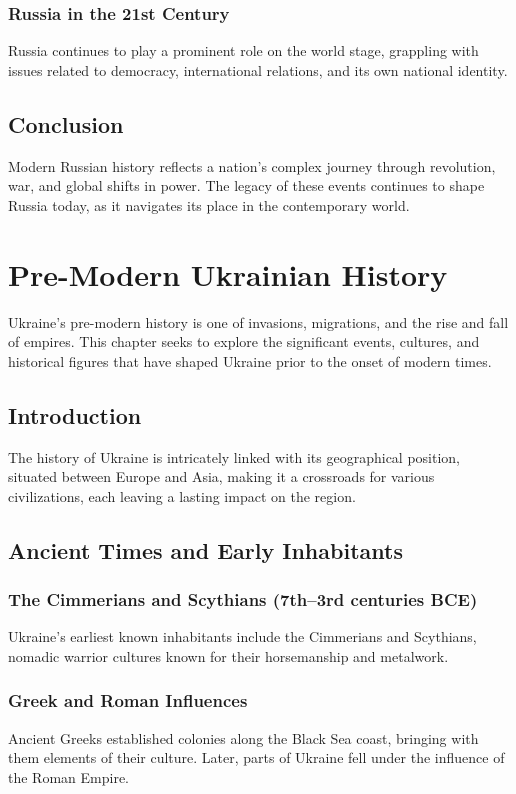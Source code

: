 \documentclass{book}
\begin{document}
\subsection{Russia in the 21st Century}
Russia continues to play a prominent role on the world stage, grappling with issues related to democracy, international relations, and its own national identity.

\section{Conclusion}
\label{sec:conclusion-modern-russia}
Modern Russian history reflects a nation’s complex journey through revolution, war, and global shifts in power. The legacy of these events continues to shape Russia today, as it navigates its place in the contemporary world.

\chapter{Pre-Modern Ukrainian History}
\label{ch:pre-modern-ukrainian-history}

Ukraine's pre-modern history is one of invasions, migrations, and the rise and fall of empires. This chapter seeks to explore the significant events, cultures, and historical figures that have shaped Ukraine prior to the onset of modern times.

\section{Introduction}
\label{sec:introduction-pre-modern-ukraine}
The history of Ukraine is intricately linked with its geographical position, situated between Europe and Asia, making it a crossroads for various civilizations, each leaving a lasting impact on the region.

\section{Ancient Times and Early Inhabitants}
\label{sec:ancient-times-early-inhabitants}
\subsection{The Cimmerians and Scythians (7th–3rd centuries BCE)}
Ukraine’s earliest known inhabitants include the Cimmerians and Scythians, nomadic warrior cultures known for their horsemanship and metalwork.

\subsection{Greek and Roman Influences}
Ancient Greeks established colonies along the Black Sea coast, bringing with them elements of their culture. Later, parts of Ukraine fell under the influence of the Roman Empire.
\end{document}
